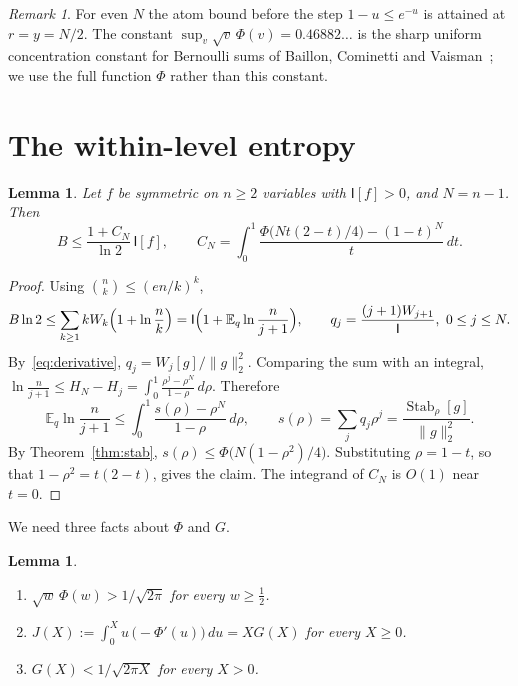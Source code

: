 \documentclass[11pt]{amsart}
\newtheorem{lemma}[theorem]{Lemma}
\theoremstyle{definition}
\theoremstyle{remark}
\newtheorem{remark}[theorem]{Remark}
\newcommand{\E}{\mathbb E}
\newcommand{\I}{\mathsf I}
\DeclareMathOperator{\Stab}{Stab}
\begin{document}
\begin{remark}
For even $N$ the atom bound before the step $1-u\le e^{-u}$ is attained at $r=y=N/2$. The constant $\sup_v\sqrt v\,\Phi(v)=0.46882\ldots$ is the sharp uniform concentration constant for Bernoulli sums of Baillon, Cominetti and Vaisman~\cite{BCV16}; we use the full function $\Phi$ rather than this constant.
\end{remark}

\section{The within-level entropy}\label{sec:within}

\begin{lemma}\label{lem:reduction}
Let $f$ be symmetric on $n\ge2$ variables with $\I[f]>0$, and $N=n-1$. Then
\[
 B\le\frac{1+C_N}{\ln2}\,\I[f],\qquad
 C_N=\int_0^1\frac{\Phi\bigl(Nt(2-t)/4\bigr)-(1-t)^N}{t}\,dt.
\]
\end{lemma}

\begin{proof}
Using $\binom nk\le(en/k)^k$,
\[
 B\ln2\le\sum_{k\ge1}kW_k\Bigl(1+\ln\frac nk\Bigr)=\I\Bigl(1+\E_q\ln\frac n{j+1}\Bigr),\qquad q_j=\frac{(j+1)W_{j+1}}{\I},\ 0\le j\le N.
\]
By~\eqref{eq:derivative}, $q_j=W_j[g]/\|g\|_2^2$. Comparing the sum with an integral, $\ln\frac{n}{j+1}\le H_N-H_j=\int_0^1\frac{\rho^j-\rho^N}{1-\rho}\,d\rho$. Therefore
\[
 \E_q\ln\frac n{j+1}\le\int_0^1\frac{s(\rho)-\rho^N}{1-\rho}\,d\rho,\qquad s(\rho)=\sum_jq_j\rho^j=\frac{\Stab_\rho[g]}{\|g\|_2^2}.
\]
By Theorem~\ref{thm:stab}, $s(\rho)\le\Phi\bigl(N(1-\rho^2)/4\bigr)$. Substituting $\rho=1-t$, so that $1-\rho^2=t(2-t)$, gives the claim. The integrand of $C_N$ is $O(1)$ near $t=0$.
\end{proof}

We need three facts about $\Phi$ and $G$.

\begin{lemma}\label{lem:bessel}
\begin{enumerate}[label=\textup{(\roman*)}]
\item $\sqrt w\,\Phi(w)>1/\sqrt{2\pi}$ for every $w\ge\tfrac12$.
\item $J(X):=\int_0^Xu\,\bigl(-\Phi'(u)\bigr)\,du=XG(X)$ for every $X\ge0$.
\item $G(X)<1/\sqrt{2\pi X}$ for every $X>0$.
\end{enumerate}
\end{lemma}
\end{document}
